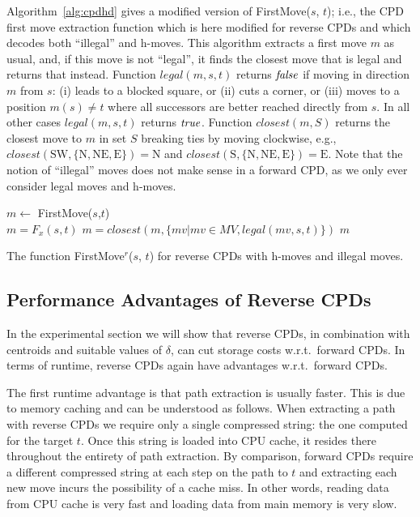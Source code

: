 Algorithm~\ref{alg:cpdhd} gives a modified version of \textsf{FirstMove}($s$, $t$); i.e., 
the CPD first move extraction function which is here modified for reverse CPDs
and which decodes both ``illegal'' and h-moves. 
This algorithm extracts a first move $m$ as usual, and, if this move is not ``legal'', 
it finds the closest move that is legal and returns that instead.  
Function $legal(m,s,t)$ returns $\mathit{false}$ if moving
in direction $m$ from $s$: (i) leads to a blocked square, or (ii) cuts a corner,
or (iii) moves to a position $m(s) \neq t$ where all successors are 
better reached directly from $s$.  In all other cases $legal(m,s,t)$ 
returns $\mathit{true}$.
Function $closest(m,S)$ returns the closest move to $m$ in set $S$
breaking ties by moving clockwise, e.g., $closest(\mbox{SW}, \{\mbox{N}, \mbox{NE}, \mbox{E}\}) = \mbox{N}$
and $closest(\mbox{S}, \{\mbox{N}, \mbox{NE}, \mbox{E}\}) = \mbox{E}$.  Note that the notion of ``illegal''
moves does not make sense in a forward CPD, as we only ever consider 
legal moves and h-moves.

\begin{algorithm}[t]
   {$m \gets$ \textsf{FirstMove}($s$,$t$) \\
         {$m = F_x(s,t)$}
         {\mbox{$m = closest(m,\{mv| mv\in MV,legal(mv,s,t)\})$}}
    \Return $m$
    }
\caption{The function \textsf{FirstMove}$^r$($s$, $t$) for reverse CPDs with h-moves and illegal moves.}
\label{alg:cpdhd}
\end{algorithm}

\subsection{Performance Advantages of Reverse CPDs}
In the experimental section we will show that reverse CPDs, in combination with
centroids and suitable values of $\delta$, can cut storage costs w.r.t.\
forward CPDs. 
In terms of runtime, reverse CPDs again have advantages w.r.t.\ forward CPDs.

The first runtime advantage is that path extraction is usually faster.
This is due to memory caching and can be understood as follows.
When extracting a path with reverse CPDs we require only a single compressed 
string: the one computed for the target $t$.
Once this string is loaded into CPU cache, it resides there throughout
the entirety of path extraction. %
By comparison, forward CPDs require a different compressed string at each step
on the path to $t$ and extracting each new move incurs the possibility of a cache miss. 
In other words, reading data from CPU cache is very fast and loading data from main memory
is very slow. 

